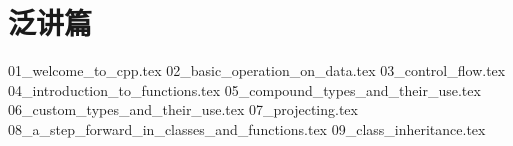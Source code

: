 \part*{泛讲篇}
{01_welcome_to_cpp.tex}
{02_basic_operation_on_data.tex}
{03_control_flow.tex}
{04_introduction_to_functions.tex}
{05_compound_types_and_their_use.tex}
{06_custom_types_and_their_use.tex}
{07_projecting.tex}
{08_a_step_forward_in_classes_and_functions.tex}
{09_class_inheritance.tex}